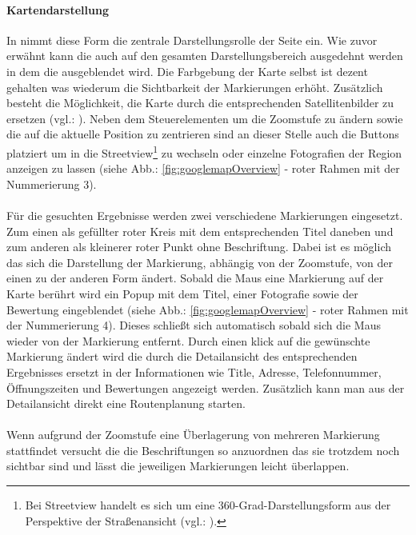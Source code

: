 \documentclass[../Bachelorarbeit.tex]{subfiles}
\begin{document}
\paragraph{Kartendarstellung}
\label{gmapsMap}
In  nimmt diese Form die zentrale Darstellungsrolle der Seite ein. 
Wie zuvor erwähnt kann die  auch auf den  gesamten Darstellungsbereich ausgedehnt werden in dem die  ausgeblendet wird.
Die Farbgebung der Karte selbst ist dezent gehalten was wiederum die Sichtbarkeit der Markierungen erhöht.
Zusätzlich besteht die Möglichkeit, die Karte durch die entsprechenden Satellitenbilder zu ersetzen (vgl.: \cite{GoogleMapsEarthView}).
Neben dem Steuerelementen um die Zoomstufe zu ändern sowie die  auf die aktuelle Position zu zentrieren sind an dieser Stelle auch die Buttons platziert um in die Streetview\footnote{
		Bei Streetview handelt es sich um eine 360-Grad-Darstellungsform aus der Perspektive der Straßenansicht (vgl.: \cite{GoogleMapsStreetview}). 
	}
zu wechseln oder einzelne Fotografien der Region anzeigen zu lassen (siehe Abb.: \ref{fig:googlemapOverview} - roter Rahmen mit der Nummerierung 3).\\
\\
Für die gesuchten Ergebnisse werden zwei verschiedene Markierungen eingesetzt. 
Zum einen als gefüllter roter Kreis mit dem entsprechenden Titel daneben und zum anderen als kleinerer roter Punkt ohne Beschriftung. 
Dabei ist es möglich das sich die Darstellung der Markierung, abhängig von der Zoomstufe, von der einen zu der anderen Form ändert.
Sobald die Maus eine Markierung auf der Karte berührt wird ein Popup mit dem Titel, einer Fotografie sowie der Bewertung eingeblendet (siehe Abb.: \ref{fig:googlemapOverview} - roter Rahmen mit der Nummerierung 4).
Dieses schließt sich automatisch sobald sich die Maus wieder von der Markierung entfernt. 
Durch einen klick auf die gewünschte Markierung ändert wird die  durch die Detailansicht des entsprechenden Ergebnisses ersetzt in der Informationen wie Title, Adresse, Telefonnummer, Öffnungszeiten und Bewertungen angezeigt werden.
Zusätzlich kann man aus der Detailansicht direkt eine Routenplanung starten. \\
\\
Wenn aufgrund der Zoomstufe eine Überlagerung von mehreren Markierung stattfindet versucht die  die Beschriftungen so anzuordnen das sie trotzdem noch sichtbar sind und lässt die jeweiligen Markierungen leicht überlappen.
\end{document}
